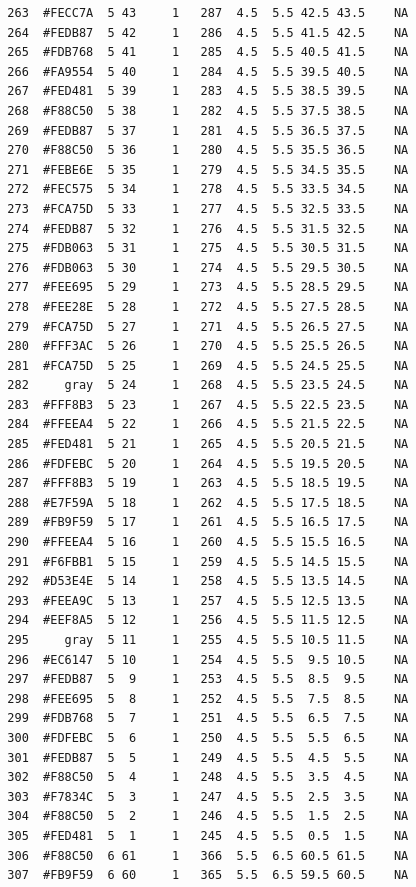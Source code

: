 \documentclass[12pt,twoside]{reedthesis}
\begin{document}
\begin{verbatim}
  263  #FECC7A  5 43     1   287  4.5  5.5 42.5 43.5    NA
  264  #FEDB87  5 42     1   286  4.5  5.5 41.5 42.5    NA
  265  #FDB768  5 41     1   285  4.5  5.5 40.5 41.5    NA
  266  #FA9554  5 40     1   284  4.5  5.5 39.5 40.5    NA
  267  #FED481  5 39     1   283  4.5  5.5 38.5 39.5    NA
  268  #F88C50  5 38     1   282  4.5  5.5 37.5 38.5    NA
  269  #FEDB87  5 37     1   281  4.5  5.5 36.5 37.5    NA
  270  #F88C50  5 36     1   280  4.5  5.5 35.5 36.5    NA
  271  #FEBE6E  5 35     1   279  4.5  5.5 34.5 35.5    NA
  272  #FEC575  5 34     1   278  4.5  5.5 33.5 34.5    NA
  273  #FCA75D  5 33     1   277  4.5  5.5 32.5 33.5    NA
  274  #FEDB87  5 32     1   276  4.5  5.5 31.5 32.5    NA
  275  #FDB063  5 31     1   275  4.5  5.5 30.5 31.5    NA
  276  #FDB063  5 30     1   274  4.5  5.5 29.5 30.5    NA
  277  #FEE695  5 29     1   273  4.5  5.5 28.5 29.5    NA
  278  #FEE28E  5 28     1   272  4.5  5.5 27.5 28.5    NA
  279  #FCA75D  5 27     1   271  4.5  5.5 26.5 27.5    NA
  280  #FFF3AC  5 26     1   270  4.5  5.5 25.5 26.5    NA
  281  #FCA75D  5 25     1   269  4.5  5.5 24.5 25.5    NA
  282     gray  5 24     1   268  4.5  5.5 23.5 24.5    NA
  283  #FFF8B3  5 23     1   267  4.5  5.5 22.5 23.5    NA
  284  #FFEEA4  5 22     1   266  4.5  5.5 21.5 22.5    NA
  285  #FED481  5 21     1   265  4.5  5.5 20.5 21.5    NA
  286  #FDFEBC  5 20     1   264  4.5  5.5 19.5 20.5    NA
  287  #FFF8B3  5 19     1   263  4.5  5.5 18.5 19.5    NA
  288  #E7F59A  5 18     1   262  4.5  5.5 17.5 18.5    NA
  289  #FB9F59  5 17     1   261  4.5  5.5 16.5 17.5    NA
  290  #FFEEA4  5 16     1   260  4.5  5.5 15.5 16.5    NA
  291  #F6FBB1  5 15     1   259  4.5  5.5 14.5 15.5    NA
  292  #D53E4E  5 14     1   258  4.5  5.5 13.5 14.5    NA
  293  #FEEA9C  5 13     1   257  4.5  5.5 12.5 13.5    NA
  294  #EEF8A5  5 12     1   256  4.5  5.5 11.5 12.5    NA
  295     gray  5 11     1   255  4.5  5.5 10.5 11.5    NA
  296  #EC6147  5 10     1   254  4.5  5.5  9.5 10.5    NA
  297  #FEDB87  5  9     1   253  4.5  5.5  8.5  9.5    NA
  298  #FEE695  5  8     1   252  4.5  5.5  7.5  8.5    NA
  299  #FDB768  5  7     1   251  4.5  5.5  6.5  7.5    NA
  300  #FDFEBC  5  6     1   250  4.5  5.5  5.5  6.5    NA
  301  #FEDB87  5  5     1   249  4.5  5.5  4.5  5.5    NA
  302  #F88C50  5  4     1   248  4.5  5.5  3.5  4.5    NA
  303  #F7834C  5  3     1   247  4.5  5.5  2.5  3.5    NA
  304  #F88C50  5  2     1   246  4.5  5.5  1.5  2.5    NA
  305  #FED481  5  1     1   245  4.5  5.5  0.5  1.5    NA
  306  #F88C50  6 61     1   366  5.5  6.5 60.5 61.5    NA
  307  #FB9F59  6 60     1   365  5.5  6.5 59.5 60.5    NA

\end{verbatim}
\end{document}
